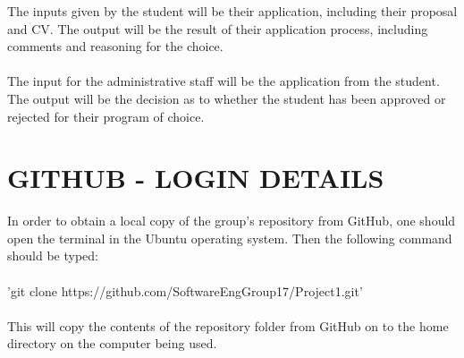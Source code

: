 \documentclass[journal,comsoc]{IEEEtran}
\begin{document}
The inputs given by the student will be their application, including their proposal and CV. The output will be the result of their application process, including comments and reasoning for the choice.
\\ \\ The input for the administrative staff will be the application from the student. The output will be the decision as to whether the student has been approved or rejected for their program of choice.


\section{GITHUB - LOGIN DETAILS}

In order to obtain a local copy of the group's repository from GitHub, one should open the terminal in the Ubuntu operating system. Then the following command should be typed: \\ \\
'git clone https://github.com/SoftwareEngGroup17/Project1.git' \\ \\
This will copy the contents of the repository folder from GitHub on to the home directory on the computer being used.







\end{document}
